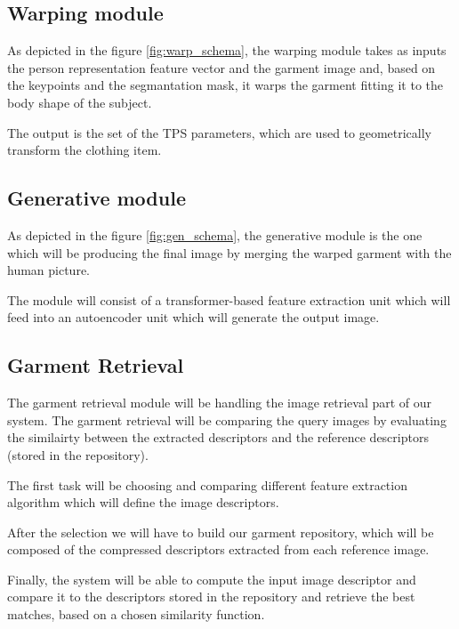\begin{multicols}{2}

\subsection{Warping module}
As depicted in the figure \ref{fig:warp_schema}, the warping module takes as inputs the person representation feature vector and the garment image and, based on the keypoints and the segmantation mask, it warps the garment fitting it to the body shape of the subject.

The output is the set of the TPS parameters, which are used to geometrically transform the clothing item.



\subsection{Generative module}
As depicted in the figure \ref{fig:gen_schema}, the generative module is the one which will be producing the final image by merging the warped garment with the human picture.

The module will consist of a transformer-based feature extraction unit which will feed into an autoencoder unit which will generate the output image.




\subsection{Garment Retrieval}
The garment retrieval module will be handling the image retrieval part of our system. The garment retrieval will be comparing the query images by evaluating the similairty between the extracted descriptors and the reference descriptors (stored in the repository). 

The first task will be choosing and comparing different feature extraction algorithm which will define the image descriptors.

After the selection we will have to build our garment repository, which will be composed of the compressed descriptors extracted from each reference image.

Finally, the system will be able to compute the input image descriptor and compare it to the descriptors stored in the repository and retrieve the best matches, based on a chosen similarity function.




\end{multicols}